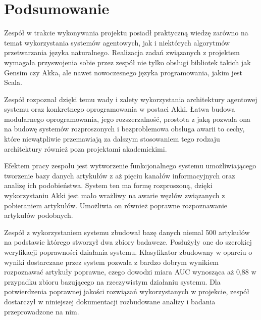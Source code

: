 \documentclass[a4paper]{article}
\begin{document}


\section{Podsumowanie}

Zespół w trakcie wykonywania projektu posiadł praktyczną wiedzę
zarówno na temat wykorzystania systemów agentowych, jak i niektórych
algorytmów przetwarzania języka naturalnego. Realizacja zadań
związanych z projektem wymagała przyswojenia sobie przez zespół nie
tylko obsługi bibliotek takich jak Gensim czy Akka, ale nawet
nowoczesnego języka programowania, jakim jest Scala.

Zespół rozpoznał dzięki temu wady i zalety wykorzystania architektury
agentowej systemu oraz konkretnego oprogramowania w postaci
Akki. Łatwa budowa modularnego oprogramowania, jego rozszerzalność,
prostota z jaką pozwala ona na budowę systemów rozproszonych i
bezproblemowa obsługa awarii to cechy, które niewątpliwie przemawiają
za dalszym stosowaniem tego rodzaju architektury również poza
projektami akademickimi.

Efektem pracy zespołu jest wytworzenie funkcjonalnego systemu
umożliwiającego tworzenie bazy danych artykułów z aż pięciu kanałów
informacyjnych oraz analizę ich podobieństwa. System ten ma formę
rozproszoną, dzięki wykorzystaniu Akki jest mało wrażliwy na awarie
węzłów związanych z pobieraniem artykułów. Umożliwia on również
poprawne rozpoznawanie artykułów podobnych.

Zespół z wykorzystaniem systemu zbudował bazę danych niemal 500
artykułów na podstawie którego stworzył dwa zbiory badawcze. Posłużyły
one do szerokiej weryfikacji poprawności działania
systemu. Klasyfikator zbudowany w oparciu o wyniki dostarczane przez
system pozwala z bardzo dobrym wynikiem rozpoznawać artykuły poprawne,
czego dowodzi miara AUC wynosząca aż 0,88 w przypadku zbioru
bazującego na rzeczywistym działaniu systemu. Dla potwierdzenia
poprawnej jakości rozwiązań wykorzystanych w projekcie, zespół
dostarczył w niniejszej dokumentacji rozbudowane analizy i badania
przeprowadzone na nim.




\end{document}
